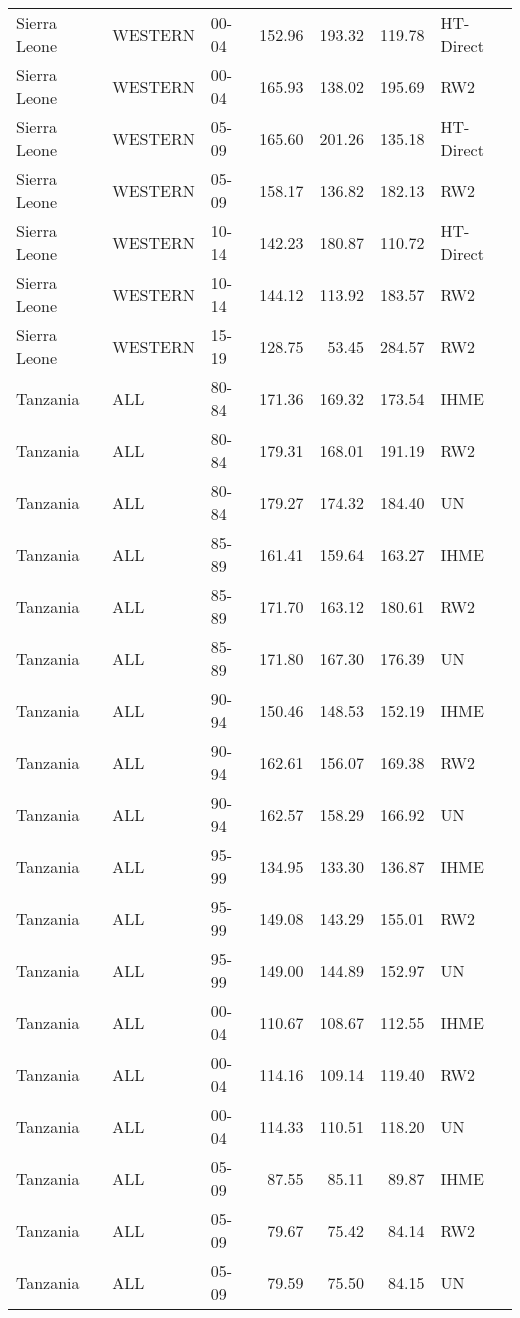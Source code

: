 \begin{longtable}{lllrrrl}
  Sierra Leone & WESTERN & 00-04 & 152.96 & 193.32 & 119.78 & HT-Direct \\ 
  Sierra Leone & WESTERN & 00-04 & 165.93 & 138.02 & 195.69 & RW2 \\ 
  Sierra Leone & WESTERN & 05-09 & 165.60 & 201.26 & 135.18 & HT-Direct \\ 
  Sierra Leone & WESTERN & 05-09 & 158.17 & 136.82 & 182.13 & RW2 \\ 
  Sierra Leone & WESTERN & 10-14 & 142.23 & 180.87 & 110.72 & HT-Direct \\ 
  Sierra Leone & WESTERN & 10-14 & 144.12 & 113.92 & 183.57 & RW2 \\ 
  Sierra Leone & WESTERN & 15-19 & 128.75 & 53.45 & 284.57 & RW2 \\ 
  Tanzania & ALL & 80-84 & 171.36 & 169.32 & 173.54 & IHME \\ 
  Tanzania & ALL & 80-84 & 179.31 & 168.01 & 191.19 & RW2 \\ 
  Tanzania & ALL & 80-84 & 179.27 & 174.32 & 184.40 & UN \\ 
  Tanzania & ALL & 85-89 & 161.41 & 159.64 & 163.27 & IHME \\ 
  Tanzania & ALL & 85-89 & 171.70 & 163.12 & 180.61 & RW2 \\ 
  Tanzania & ALL & 85-89 & 171.80 & 167.30 & 176.39 & UN \\ 
  Tanzania & ALL & 90-94 & 150.46 & 148.53 & 152.19 & IHME \\ 
  Tanzania & ALL & 90-94 & 162.61 & 156.07 & 169.38 & RW2 \\ 
  Tanzania & ALL & 90-94 & 162.57 & 158.29 & 166.92 & UN \\ 
  Tanzania & ALL & 95-99 & 134.95 & 133.30 & 136.87 & IHME \\ 
  Tanzania & ALL & 95-99 & 149.08 & 143.29 & 155.01 & RW2 \\ 
  Tanzania & ALL & 95-99 & 149.00 & 144.89 & 152.97 & UN \\ 
  Tanzania & ALL & 00-04 & 110.67 & 108.67 & 112.55 & IHME \\ 
  Tanzania & ALL & 00-04 & 114.16 & 109.14 & 119.40 & RW2 \\ 
  Tanzania & ALL & 00-04 & 114.33 & 110.51 & 118.20 & UN \\ 
  Tanzania & ALL & 05-09 & 87.55 & 85.11 & 89.87 & IHME \\ 
  Tanzania & ALL & 05-09 & 79.67 & 75.42 & 84.14 & RW2 \\ 
  Tanzania & ALL & 05-09 & 79.59 & 75.50 & 84.15 & UN \\ 

\end{longtable}
